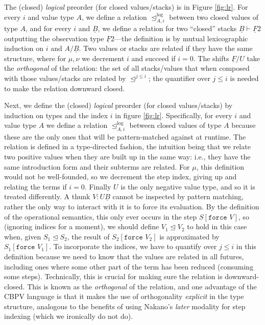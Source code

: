 \documentclass[acmsmall,nonacm]{acmart}
\renewcommand{\u}{\underline}
\newcommand{\apreorder}{\trianglelefteq}
\newcommand{\itylrof}[3]{\ilrof{#1}{#3,#2}}
\newcommand{\ilrof}[2]{\mathrel{{#1}^{\text{log}}_{#2}}}
\newcommand{\kw}[1]{\texttt{#1}\,\,}
\newcommand{\force}{\kw{force}}
\begin{document}
{\begin{shortonly}
The (closed) \emph{logical} preorder (for closed values/stacks) is in Figure
\ref{fig:lr}.  For every $i$ and value type $A$, we define a relation
$\itylrof \apreorder i A$ between two closed values of type $A$, and for
every $i$ and $\u B$, we define a relation for two ``closed'' stacks $\u
B \vdash \u F 2$ outputting the observation type $\u F 2$---the
definition is by mutual lexicographic induction on $i$ and $A/\u B$.
Two values or stacks are related if they have the same structure, where
for $\mu,\nu$ we decrement $i$ and succeed if $i = 0$.  The shifts $\u
F/U$ take the \emph{orthogonal} of the relation: the set of all
stacks/values that when composed with those values/stacks are related by
$\apreorder^{j \le i}$; the quantifier over $j \leq i$ is needed to make the
relation downward closed.
\end{shortonly}

\begin{longonly}
Next, we define the (closed) \emph{logical} preorder (for closed values/stacks) by induction on types and
the index $i$ in figure \ref{fig:lr}.
%
Specifically, for every $i$ and value type $A$ we define a relation
$\itylrof \apreorder i A$ between closed values of type $A$ because
these are the only ones that will be pattern-matched against at
runtime.
%
The relation is defined in a type-directed fashion, the intuition being
that we relate two positive values when they are built up in the same
way: i.e., they have the same introduction form and their subterms are
related.
%
For $\mu$, this definition would not be well-founded, so we decrement
the step index, giving up and relating the terms if $i = 0$.
%
Finally $U$ is the only negative value type, and so it is treated
differently.
%
A thunk $V : U\u B$ cannot be inspected by pattern matching, rather
the only way to interact with it is to force its evaluation.
%
By the definition of the operational semantics, this only ever occurs
in the step $S[\force V]$, so (ignoring indices for a moment), we
should define $V_1 \apreorder V_2$ to hold in this case when, given
$S_1 \apreorder S_2$, the result of $S_2[\force V_2]$ is approximated
by $S_1[\force V_1]$.
%
To incorporate the indices, we have to quantify over $j \leq i$ in
this definition because we need to know that the values are related in
all futures, including ones where some other part of the term has been
reduced (consuming some steps).
%
Technically, this is crucial for making sure the relation is
downward-closed.
%
This is known as the \emph{orthogonal} of the relation, and one
advantage of the CBPV language is that it makes the use of
orthogonality \emph{explicit} in the type structure, analogous to the
benefits of using Nakano's \emph{later} modality \cite{nakano} for step indexing
(which we ironically do not do).


\end{longonly}}
\end{document}
